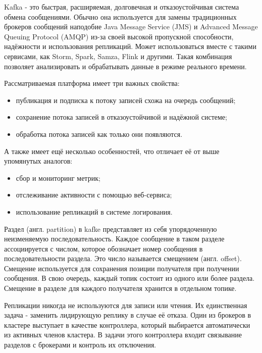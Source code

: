 Kafka - это быстрая, расширяемая, долговечная и отказоустойчивая система обмена сообщениями.
Обычно она используется для замены традиционных брокеров сообщений наподобие Java Message Service (JMS) и Advanced Message Queuing Protocol (AMQP) из-за своей высокой пропускной способности, надёжности и использования репликаций.
Может использоваться вместе с такими сервисами, как Storm, Spark, Samza, Flink и другими.
Такая комбинация позволяет анализировать и обрабатывать данные в режиме реального времени.

Рассматриваемая платформа имеет три важных свойства:
\begin{itemize}
    \item публикация и подписка к потоку записей схожа на очередь сообщений;
    \item сохранение потока записей в отказоустойчивой и надёжной системе;
    \item обработка потока записей как только они появляются.
\end{itemize}

А также имеет ещё несколько особенностей, что отличает её от выше упомянутых аналогов:
\begin{itemize}
    \item сбор и мониторинг метрик;
    \item отслеживание активности с помощью веб-сервиса;
    \item использование репликаций в системе логирования.
\end{itemize}

Раздел (англ. partition) в kafke представляет из себя упорядоченную неизменяемую последовательность.
Каждое сообщение в таком разделе ассоциируется с числом, которое обозначает номер сообщения в последовательности раздела.
Это число называется смещением (англ. offset).
Смещение используется для сохранения позиции получателя при получении сообщения.
В свою очередь, каждый топик состоит из одного или более раздела.
Смещение в разделе для каждого получателя хранится в отдельном топике.

Репликации никогда не используются для записи или чтения.
Их единственная задача - заменить лидирующую реплику в случае её отказа.
Один из брокеров в кластере выступает в качестве контроллера, который выбирается автоматически из активных членов кластера.
В задачи этого контроллера входит связывание разделов с брокерами и контроль их отключения.

